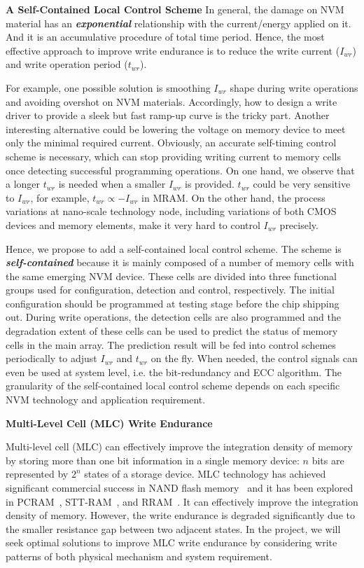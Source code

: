 \squishlist \item {\textbf{A Self-Contained Local Control Scheme}} \squishend
In general, the damage on NVM material has an \textbf{\emph{exponential}} relationship with the current/energy applied on it. And it is an accumulative procedure of total time period. Hence, the most effective approach to improve write endurance is to reduce the write current ($I_{wr}$) and write operation period ($t_{wr}$).

For example, one possible solution is smoothing $I_{wr}$ shape during write operations and avoiding overshot on NVM materials. Accordingly, how to design a write driver to provide a sleek but fast ramp-up curve is the tricky part. Another interesting alternative could be lowering the voltage on memory device to meet only the minimal required current. Obviously, an accurate self-timing control scheme is necessary, which can stop providing writing current to memory cells once detecting successful programming operations. On one hand, we observe that a longer $t_{wr}$ is needed when a smaller $I_{wr}$ is provided. $t_{wr}$ could be very sensitive to $I_{wr}$, for example, $t_{wr}\propto{-I_{wr}}$ in MRAM. On the other hand, the process variations at nano-scale technology node, including variations of both CMOS devices and memory elements, make it very hard to control $I_{wr}$ precisely.

Hence, we propose to add a self-contained local control scheme. The scheme is \emph{\textbf{self-contained}} because it is mainly composed of a number of memory cells with the same emerging NVM device. These cells are divided into three functional groups used for configuration, detection and control, respectively. The initial configuration should be programmed at testing stage before the chip shipping out. During write operations, the detection cells are also programmed and the degradation extent of these cells can be used to predict the status of memory cells in the main array. The prediction result will be fed into control schemes periodically to adjust $I_{wr}$ and $t_{wr}$ on the fly. When needed, the control signals can even be used at system level, i.e. the bit-redundancy and ECC algorithm. The granularity of the self-contained local control scheme depends on each specific NVM technology and application requirement.

\squishlist \item {\textbf{Multi-Level Cell (MLC) Write Endurance}} \squishend

Multi-level cell (MLC) can effectively improve the integration density of memory by storing more than one bit information in a single memory device: $n$ bits are represented by  $2^n$ states of a storage device. MLC technology has achieved significant commercial success in NAND flash memory~\cite{Park04} and it has been explored in PCRAM~\cite{Raoux08,Bedeschi09}, STT-RAM~\cite{Lou08}, and RRAM~\cite{Baek05}. It can effectively improve the integration density of memory. However, the write endurance is degraded significantly due to the smaller resistance gap between two adjacent states. In the project, we will seek optimal solutions to improve MLC write endurance by considering write patterns of both physical mechanism and system requirement.

